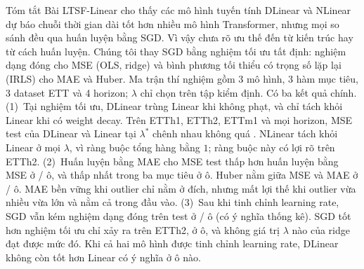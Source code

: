 \begin{infobox}{Tóm tắt}
Bài LTSF-Linear cho thấy các mô hình tuyến tính DLinear và NLinear dự báo chuỗi thời gian dài tốt hơn nhiều mô hình Transformer, nhưng mọi so sánh đều qua huấn luyện bằng SGD. Vì vậy chưa rõ ưu thế đến từ kiến trúc hay từ cách huấn luyện. Chúng tôi thay SGD bằng nghiệm tối ưu tất định: nghiệm dạng đóng cho MSE (OLS, ridge) và bình phương tối thiểu có trọng số lặp lại (IRLS) cho MAE và Huber. Ma trận thí nghiệm gồm 3 mô hình, 3 hàm mục tiêu, 3 dataset ETT và 4 horizon; $\lambda$ chỉ chọn trên tập kiểm định. Có ba kết quả chính.
(1)~Tại nghiệm tối ưu, DLinear trùng Linear khi không phạt, và chỉ tách khỏi Linear khi có weight decay. Trên ETTh1, ETTh2, ETTm1 và mọi horizon, MSE test của DLinear và Linear tại $\lambda^*$ chênh nhau không quá \nmBThreeDLinMinusLinAbsMax. NLinear tách khỏi Linear ở mọi $\lambda$, vì ràng buộc tổng hàng bằng $1$; ràng buộc này có lợi rõ trên ETTh2.
(2)~Huấn luyện bằng MAE cho MSE test thấp hơn huấn luyện bằng MSE ở \nmBThreeMaeBeatsMseTotalCount/\nmBThreeCellCount{} ô, và thấp nhất trong ba mục tiêu ở \nmBThreeBestMAEMseCount{} ô. Huber nằm giữa MSE và MAE ở \nmBThreeHuberRankTwoMseCount/\nmBThreeCellCount{} ô. MAE bền vững khi outlier chỉ nằm ở đích, nhưng mất lợi thế khi outlier vừa nhiều vừa lớn và nằm cả trong đầu vào.
(3)~Sau khi tinh chỉnh learning rate, SGD vẫn kém nghiệm dạng đóng trên test ở \nmTunedWorseSigCount/\nmBThreeCellCount{} ô (có ý nghĩa thống kê). SGD tốt hơn nghiệm tối ưu chỉ xảy ra trên ETTh2, ở \nmTunedSgdBetterCount{} ô, và không giá trị $\lambda$ nào của ridge đạt được mức đó. Khi cả hai mô hình được tinh chỉnh learning rate, DLinear không còn tốt hơn Linear có ý nghĩa ở ô nào.
\end{infobox}
